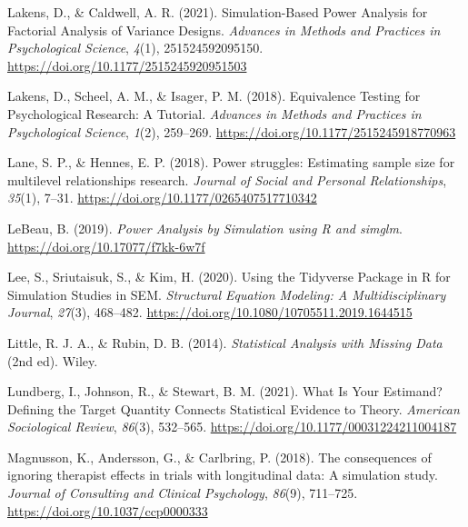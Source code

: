 \documentclass[
  man,
  floatsintext,
  longtable,
  a4paper,
  nolmodern,
  notxfonts,
  notimes,
  colorlinks=true,linkcolor=blue,citecolor=blue,urlcolor=blue]{apa7}
\newlength{\cslhangindent}
\newenvironment{CSLReferences}[2] %
 {\begin{list}{}{%
  \setlength{\itemindent}{0pt}
  \setlength{\leftmargin}{0pt}
  \setlength{\parsep}{0pt}
  \ifodd #1
   \setlength{\leftmargin}{\cslhangindent}
   \setlength{\itemindent}{-1\cslhangindent}
  \fi
  \setlength{\itemsep}{#2\baselineskip}}}
 {\end{list}}
\begin{document}
\begin{CSLReferences}{1}{0}
Lakens, D., \& Caldwell, A. R. (2021). Simulation-{Based Power Analysis}
for {Factorial Analysis} of {Variance Designs}. \emph{Advances in
Methods and Practices in Psychological Science}, \emph{4}(1),
251524592095150. \url{https://doi.org/10.1177/2515245920951503}

Lakens, D., Scheel, A. M., \& Isager, P. M. (2018). Equivalence
{Testing} for {Psychological Research}: {A Tutorial}. \emph{Advances in
Methods and Practices in Psychological Science}, \emph{1}(2), 259--269.
\url{https://doi.org/10.1177/2515245918770963}

Lane, S. P., \& Hennes, E. P. (2018). Power struggles: {Estimating}
sample size for multilevel relationships research. \emph{Journal of
Social and Personal Relationships}, \emph{35}(1), 7--31.
\url{https://doi.org/10.1177/0265407517710342}

LeBeau, B. (2019). \emph{Power {Analysis} by {Simulation} using {R} and
simglm}. \url{https://doi.org/10.17077/f7kk-6w7f}

Lee, S., Sriutaisuk, S., \& Kim, H. (2020). Using the {Tidyverse
Package} in {R} for {Simulation Studies} in {SEM}. \emph{Structural
Equation Modeling: A Multidisciplinary Journal}, \emph{27}(3), 468--482.
\url{https://doi.org/10.1080/10705511.2019.1644515}

Little, R. J. A., \& Rubin, D. B. (2014). \emph{Statistical {Analysis}
with {Missing Data}} (2nd ed). Wiley.

Lundberg, I., Johnson, R., \& Stewart, B. M. (2021). What {Is Your
Estimand}? {Defining} the {Target Quantity Connects Statistical
Evidence} to {Theory}. \emph{American Sociological Review},
\emph{86}(3), 532--565. \url{https://doi.org/10.1177/00031224211004187}

Magnusson, K., Andersson, G., \& Carlbring, P. (2018). The consequences
of ignoring therapist effects in trials with longitudinal data: {A}
simulation study. \emph{Journal of Consulting and Clinical Psychology},
\emph{86}(9), 711--725. \url{https://doi.org/10.1037/ccp0000333}


\end{CSLReferences}
\end{document}
